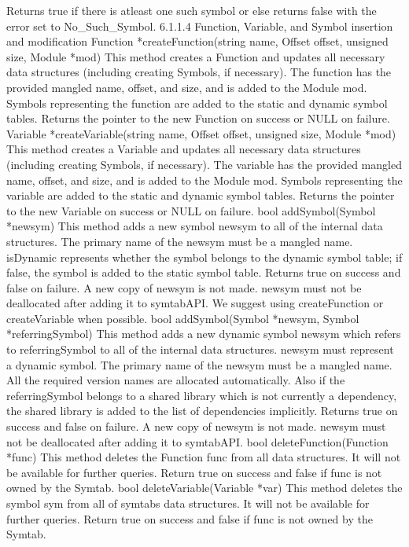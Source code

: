 Returns true if there is atleast one such symbol or else returns false with the error set to No_Such_Symbol.
6.1.1.4 Function, Variable, and Symbol insertion and modification
Function *createFunction(string name, Offset offset, unsigned size, Module *mod)
This method creates a Function and updates all necessary data structures (including creating Symbols, if necessary). The function has the provided mangled name, offset, and size, and is added to the Module mod. Symbols representing the function are added to the static and dynamic symbol tables. Returns the pointer to the new Function on success or NULL on failure. 
Variable *createVariable(string name, Offset offset, unsigned size, Module *mod)
This method creates a Variable and updates all necessary data structures (including creating Symbols, if necessary). The variable has the provided mangled name, offset, and size, and is added to the Module mod. Symbols representing the variable are added to the static and dynamic symbol tables. Returns the pointer to the new Variable on success or NULL on failure. 
bool addSymbol(Symbol *newsym)
This method adds a new symbol newsym to all of the internal data structures. The primary name of the newsym must be a mangled name. isDynamic represents whether the symbol belongs to the dynamic symbol table; if false, the symbol is added to the static symbol table. Returns true on success and false on failure. A new copy of newsym is not made. newsym must not be deallocated after adding it to symtabAPI.
We suggest using createFunction or createVariable when possible.
bool addSymbol(Symbol *newsym, Symbol *referringSymbol)
This method adds a new dynamic symbol newsym which refers to referringSymbol to all of the internal data structures. newsym must represent a dynamic symbol. The primary name of the newsym must be a mangled name. All the required version names are allocated automatically. Also if the referringSymbol belongs to a shared library which is not currently a dependency, the shared library is added to the list of dependencies implicitly. Returns true on success and false on failure. A new copy of newsym is not made. newsym must not be deallocated after adding it to symtabAPI.
bool deleteFunction(Function *func)
This method deletes the Function func from all data structures. It will not be available for further queries. Return true on success and false if func is not owned by the Symtab.
bool deleteVariable(Variable *var)
This method deletes the symbol sym from all of symtabs data structures. It will not be available for further queries. Return true on success and false if func is not owned by the Symtab.
